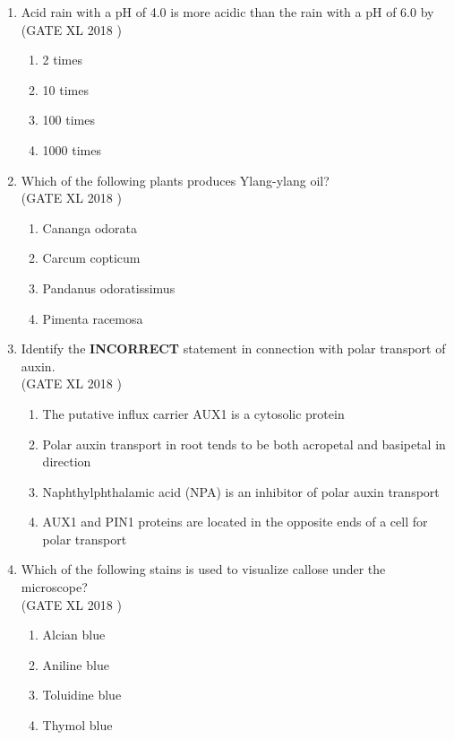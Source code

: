 \documentclass[14pt]{extarticle}
\begin{document}
\begin{flushleft}
\begin{enumerate}[leftmargin=*]
    \item Acid rain with a pH of 4.0 is more acidic than the rain with a pH of 6.0 by\\
    \hfill(GATE XL 2018 )
    \begin{multicols}{2}
    \begin{enumerate}
        \item 2 times
        \item 10 times
        \item 100 times
        \item 1000 times
    \end{enumerate}
    \end{multicols}

    \item Which of the following plants produces Ylang-ylang oil?\\
    \hfill(GATE XL 2018 )
    \begin{multicols}{2}
    \begin{enumerate}
        \item Cananga odorata
        \item Carcum copticum
        \item Pandanus odoratissimus
        \item Pimenta racemosa
    \end{enumerate}
    \end{multicols}

    \item Identify the \textbf{INCORRECT} statement in connection with polar transport of auxin.\\
    \hfill(GATE XL 2018 )
    \begin{enumerate}
        \item The putative influx carrier AUX1 is a cytosolic protein
        \item Polar auxin transport in root tends to be both acropetal and basipetal in direction
        \item Naphthylphthalamic acid (NPA) is an inhibitor of polar auxin transport
        \item AUX1 and PIN1 proteins are located in the opposite ends of a cell for polar transport
    \end{enumerate}
     

    \item Which of the following stains is used to visualize callose under the microscope?\\
    \hfill(GATE XL 2018 )
    \begin{multicols}{2}
    \begin{enumerate}
        \item Alcian blue
        \item Aniline blue
        \item Toluidine blue
        \item Thymol blue
    \end{enumerate}
    \end{multicols}


\end{enumerate}
\end{flushleft}
\end{document}
